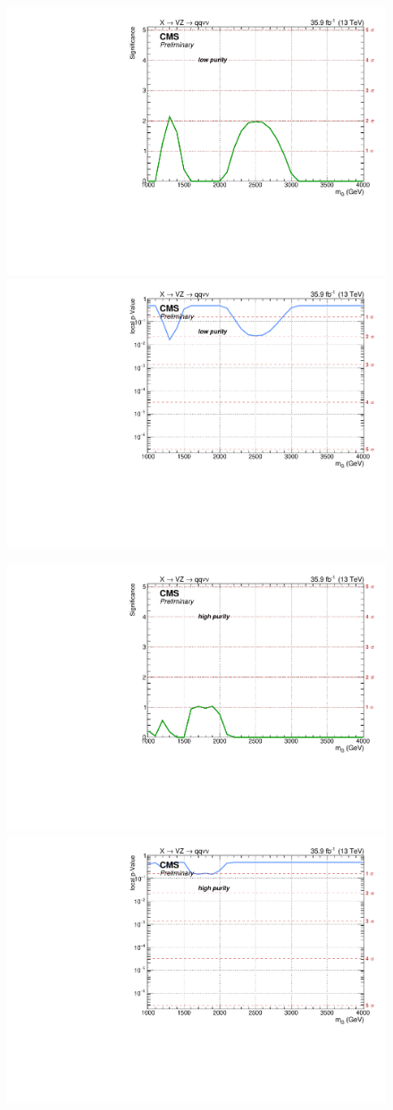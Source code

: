 \begin{figure}[!htb]
  \begin{center}
     \includegraphics[width=.495\textwidth]{v9/plotsAlpha/Limits/Significance_XZZInv_XVZnnlp.pdf}%
     \includegraphics[width=.495\textwidth]{v9/plotsAlpha/Limits/pValue_XZZInv_XVZnnlp.pdf}

     \includegraphics[width=.495\textwidth]{v9/plotsAlpha/Limits/Significance_XZZInv_XVZnnhp.pdf}%
     \includegraphics[width=.495\textwidth]{v9/plotsAlpha/Limits/pValue_XZZInv_XVZnnhp.pdf}


\end{center}
\end{figure}

